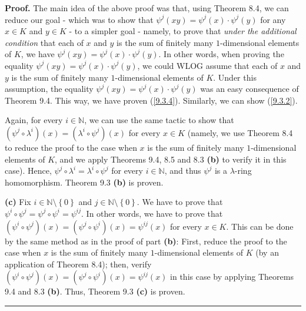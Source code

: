 \documentclass[numbers=enddot,12pt,final,onecolumn,notitlepage]{scrartcl}%
\newenvironment{proof}[1][Proof]{\noindent\textbf{#1.} }{\ \rule{0.5em}{0.5em}}
\begin{document}
\begin{proof}
The main idea of the above proof was that, using Theorem 8.4, we can reduce
our goal - which was to show that $\psi^{j}\left(  xy\right)  =\psi^{j}\left(
x\right)  \cdot\psi^{j}\left(  y\right)  $ for any $x\in K$ and $y\in K$ - to
a simpler goal - namely, to prove that \textit{under the additional condition}
that each of $x$ and $y$ is the sum of finitely many $1$-dimensional elements
of $K$, we have $\psi^{j}\left(  xy\right)  =\psi^{j}\left(  x\right)
\cdot\psi^{j}\left(  y\right)  $. In other words, when proving the equality
$\psi^{j}\left(  xy\right)  =\psi^{j}\left(  x\right)  \cdot\psi^{j}\left(
y\right)  $, we could WLOG assume that each of $x$ and $y$ is the sum of
finitely many $1$-dimensional elements of $K$. Under this assumption, the
equality $\psi^{j}\left(  xy\right)  =\psi^{j}\left(  x\right)  \cdot\psi
^{j}\left(  y\right)  $ was an easy consequence of Theorem 9.4. This way, we
have proven (\ref{9.3.4}). Similarly, we can show (\ref{9.3.2}).

Again, for every $i\in\mathbb{N}$, we can use the same tactic to show that
$\left(  \psi^{j}\circ\lambda^{i}\right)  \left(  x\right)  =\left(
\lambda^{i}\circ\psi^{j}\right)  \left(  x\right)  $ for every $x\in K$
(namely, we use Theorem 8.4 to reduce the proof to the case when $x$ is the
sum of finitely many $1$-dimensional elements of $K$, and we apply Theorems
9.4, 8.5 and 8.3 \textbf{(b)} to verify it in this case). Hence, $\psi
^{j}\circ\lambda^{i}=\lambda^{i}\circ\psi^{j}$ for every $i\in\mathbb{N}$, and
thus $\psi^{j}$ is a $\lambda$-ring homomorphism. Theorem 9.3 \textbf{(b)} is proven.

\textbf{(c)} Fix $i\in\mathbb{N}\setminus\left\{  0\right\}  $ and
$j\in\mathbb{N}\setminus\left\{  0\right\}  $. We have to prove that $\psi
^{i}\circ\psi^{j}=\psi^{j}\circ\psi^{i}=\psi^{ij}$. In other words, we have to
prove that $\left(  \psi^{i}\circ\psi^{j}\right)  \left(  x\right)  =\left(
\psi^{j}\circ\psi^{i}\right)  \left(  x\right)  =\psi^{ij}\left(  x\right)  $
for every $x\in K$. This can be done by the same method as in the proof of
part \textbf{(b)}: First, reduce the proof to the case when $x$ is the sum of
finitely many $1$-dimensional elements of $K$ (by an application of Theorem
8.4); then, verify $\left(  \psi^{i}\circ\psi^{j}\right)  \left(  x\right)
=\left(  \psi^{j}\circ\psi^{i}\right)  \left(  x\right)  =\psi^{ij}\left(
x\right)  $ in this case by applying Theorems 9.4 and 8.3 \textbf{(b)}. Thus,
Theorem 9.3 \textbf{(c)} is proven.
\end{proof}
\end{document}
